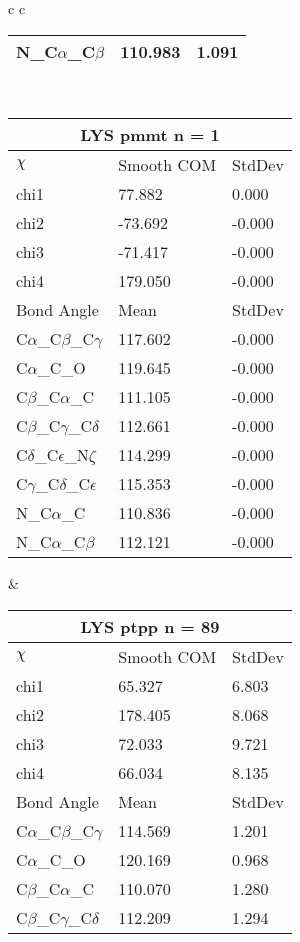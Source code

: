 \begin{longtable}{ c c }
\begin{tabular}{ l l l }
  N\_C$\alpha$\_C$\beta$ & 110.983 & 1.091\\
  \bottomrule
  \end{tabular}
  \\
  \begin{tabular}{ l l l }
  \toprule
  \multicolumn{3}{c}{LYS \textbf{pmmt} n = 1} \\ \toprule
  $\chi$       & Smooth COM & StdDev \\ \midrule
  chi1 & 77.882 & 0.000 \\ 
  chi2 & -73.692 & -0.000 \\ 
  chi3 & -71.417 & -0.000 \\ 
  chi4 & 179.050 & -0.000 \\ \midrule
  Bond Angle   & Mean     & StdDev \\ \midrule
  C$\alpha$\_C$\beta$\_C$\gamma$ & 117.602 & -0.000\\
  C$\alpha$\_C\_O & 119.645 & -0.000\\
  C$\beta$\_C$\alpha$\_C & 111.105 & -0.000\\
  C$\beta$\_C$\gamma$\_C$\delta$ & 112.661 & -0.000\\
  C$\delta$\_C$\epsilon$\_N$\zeta$ & 114.299 & -0.000\\
  C$\gamma$\_C$\delta$\_C$\epsilon$ & 115.353 & -0.000\\
  N\_C$\alpha$\_C & 110.836 & -0.000\\
  N\_C$\alpha$\_C$\beta$ & 112.121 & -0.000\\
  \bottomrule
  \end{tabular}
  &
  \begin{tabular}{ l l l }
  \toprule
  \multicolumn{3}{c}{LYS \textbf{ptpp} n = 89} \\ \toprule
  $\chi$       & Smooth COM & StdDev \\ \midrule
  chi1 & 65.327 & 6.803 \\ 
  chi2 & 178.405 & 8.068 \\ 
  chi3 & 72.033 & 9.721 \\ 
  chi4 & 66.034 & 8.135 \\ \midrule
  Bond Angle   & Mean     & StdDev \\ \midrule
  C$\alpha$\_C$\beta$\_C$\gamma$ & 114.569 & 1.201\\
  C$\alpha$\_C\_O & 120.169 & 0.968\\
  C$\beta$\_C$\alpha$\_C & 110.070 & 1.280\\
  C$\beta$\_C$\gamma$\_C$\delta$ & 112.209 & 1.294\\

\end{tabular}
\end{longtable}
